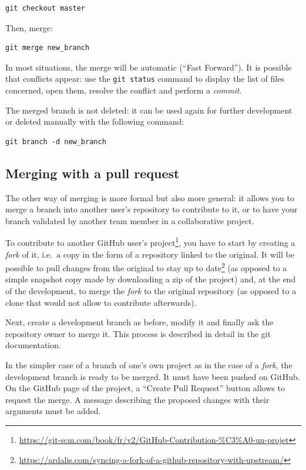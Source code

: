\documentclass[
  12pt,
  american,
  a4paper,
  extrafontsizes,onecolumn,openright
  ]{memoir}
\newlength{\rf}
\begin{document}
\begin{verbatim}
git checkout master
\end{verbatim}

Then, merge:

\begin{verbatim}
git merge new_branch
\end{verbatim}

In most situations, the merge will be automatic (\enquote{Fast Forward}).
It is possible that conflicts appear: use the \texttt{git\ status} command to display the list of files concerned, open them, resolve the conflict and perform a \emph{commit}.

The merged branch is not deleted: it can be used again for further development or deleted manually with the following command:

\begin{verbatim}
git branch -d new_branch
\end{verbatim}

\hypertarget{merging-with-a-pull-request}{%
\subsection{Merging with a pull request}\label{merging-with-a-pull-request}}

The other way of merging is more formal but also more general: it allows you to merge a branch into another user's repository to contribute to it, or to have your branch validated by another team member in a collaborative project.

To contribute to another GitHub user's project\footnote{\url{https://git-scm.com/book/fr/v2/GitHub-Contribution-\%C3\%A0-un-projet}}, you have to start by creating a \emph{fork} of it, i.e.~a copy in the form of a repository linked to the original.
It will be possible to pull changes from the original to stay up to date\footnote{\url{https://ardalis.com/syncing-a-fork-of-a-github-repository-with-upstream/}} (as opposed to a simple snapshot copy made by downloading a zip of the project) and, at the end of the development, to merge the \emph{fork} to the original repository (as opposed to a clone that would not allow to contribute afterwards).

Next, create a development branch as before, modify it and finally ask the repository owner to merge it.
This process is described in detail in the git documentation.

In the simpler case of a branch of one's own project as in the case of a \emph{fork}, the development branch is ready to be merged.
It must have been pushed on GitHub.
On the GitHub page of the project, a \enquote{Create Pull Request} button allows to request the merge.
A message describing the proposed changes with their arguments must be added.
\end{document}
